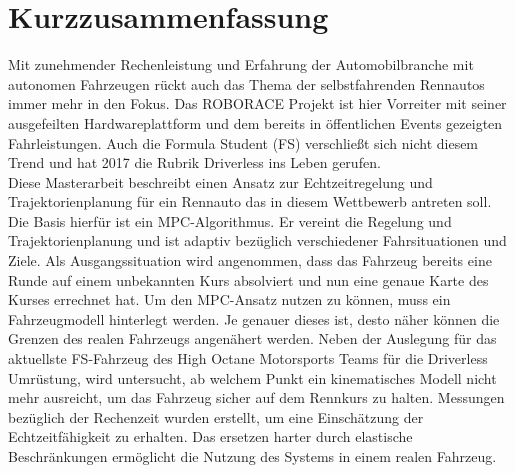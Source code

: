
\chapter*{Kurzzusammenfassung}

Mit zunehmender Rechenleistung und Erfahrung der Automobilbranche mit autonomen Fahrzeugen rückt auch das Thema der selbstfahrenden Rennautos immer mehr in den Fokus. Das ROBORACE Projekt ist hier Vorreiter mit seiner ausgefeilten Hardwareplattform und dem bereits in öffentlichen Events gezeigten Fahrleistungen. Auch die Formula Student (FS) verschließt sich nicht diesem Trend und hat 2017 die Rubrik Driverless ins Leben gerufen. \\
Diese Masterarbeit beschreibt einen Ansatz zur Echtzeitregelung und Trajektorienplanung für ein Rennauto das in diesem Wettbewerb antreten soll. Die Basis hierfür ist ein \ac{MPC}-Algorithmus. Er vereint die Regelung und Trajektorienplanung und ist adaptiv bezüglich verschiedener Fahrsituationen und Ziele.
Als Ausgangssituation wird angenommen, dass das Fahrzeug bereits eine Runde auf einem unbekannten Kurs absolviert und nun eine genaue Karte des Kurses errechnet hat. 
Um den \ac{MPC}-Ansatz nutzen zu können, muss ein Fahrzeugmodell hinterlegt werden. Je genauer dieses ist, desto näher können die Grenzen des realen Fahrzeugs angenähert werden. Neben der Auslegung für das aktuellste FS-Fahrzeug des High Octane Motorsports Teams für die Driverless Umrüstung, wird untersucht, ab welchem Punkt ein kinematisches Modell nicht mehr ausreicht, um das Fahrzeug sicher auf dem Rennkurs zu halten. Messungen bezüglich der Rechenzeit wurden erstellt, um eine Einschätzung der Echtzeitfähigkeit zu erhalten. Das ersetzen harter durch elastische Beschränkungen ermöglicht die Nutzung des Systems in einem realen Fahrzeug. 


